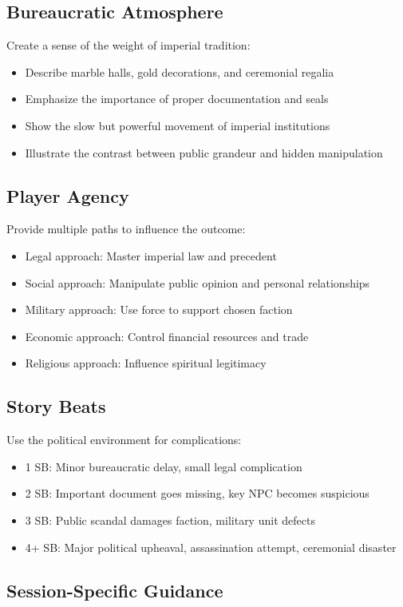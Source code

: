 \documentclass[11pt]{article}
\begin{document}
\subsection{Bureaucratic Atmosphere}
Create a sense of the weight of imperial tradition:
\begin{itemize}
\item Describe marble halls, gold decorations, and ceremonial regalia
\item Emphasize the importance of proper documentation and seals
\item Show the slow but powerful movement of imperial institutions
\item Illustrate the contrast between public grandeur and hidden manipulation
\end{itemize}

\subsection{Player Agency}
Provide multiple paths to influence the outcome:
\begin{itemize}
\item Legal approach: Master imperial law and precedent
\item Social approach: Manipulate public opinion and personal relationships
\item Military approach: Use force to support chosen faction
\item Economic approach: Control financial resources and trade
\item Religious approach: Influence spiritual legitimacy
\end{itemize}

\subsection{Story Beats}
Use the political environment for complications:
\begin{itemize}
\item 1 SB: Minor bureaucratic delay, small legal complication
\item 2 SB: Important document goes missing, key NPC becomes suspicious
\item 3 SB: Public scandal damages faction, military unit defects
\item 4+ SB: Major political upheaval, assassination attempt, ceremonial disaster
\end{itemize}

\subsection{Session-Specific Guidance}
\end{document}
